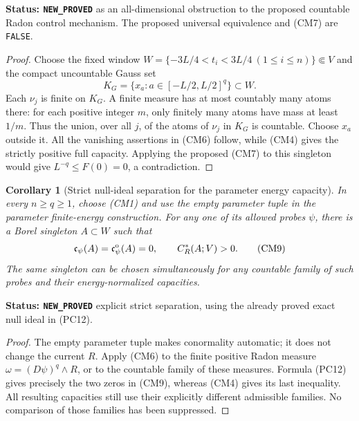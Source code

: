 \documentclass[11pt,a4paper]{article}
\numberwithin{equation}{section}
\newtheorem{corollary}[theorem]{Corollary}
\theoremstyle{definition}
\theoremstyle{remark}
\begin{document}
\noindent\textbf{Status: \texttt{NEW\_PROVED}} as an
all-dimensional obstruction to the proposed countable Radon
control mechanism. The proposed universal equivalence and (CM7)
are \texttt{FALSE}.

\begin{proof}
Choose the fixed window
$W=\{-3L/4<t_i<3L/4\ (1\leq i\leq n)\}\Subset V$
and the compact uncountable Gauss set
\[
                    K_G=\{x_a:a\in[-L/2,L/2]^q\}\subset W.
 \tag{CM8}
\]
Each $\nu_j$ is finite on $K_G$. A finite measure has at most
countably many atoms there: for each positive integer $m$, only
finitely many atoms have mass at least $1/m$. Thus the union,
over all $j$, of the atoms of $\nu_j$ in $K_G$ is countable.
Choose $x_a$ outside it. All the vanishing assertions in (CM6)
follow, while (CM4) gives the strictly positive full capacity.
Applying the proposed (CM7) to this singleton would give
$L^{-q}\leq F(0)=0$, a contradiction.
\end{proof}

\begin{corollary}[Strict null-ideal separation for the parameter energy capacity]
\label{cor:r12-parameter-capacity-strict-null-ideal}
In every $n\geq q\geq1$, choose (CM1) and use the empty parameter
tuple in the parameter finite-energy construction. For any one of
its allowed probes $\psi$, there is a Borel singleton $A\subset W$
such that
\[
                  \mathfrak c_\psi(A)
                    =\mathfrak c_\psi^{\rm o}(A)=0,
                         \qquad C_R^*(A;V)>0.
 \tag{CM9}
\]
The same singleton can be chosen simultaneously for any countable
family of such probes and their energy-normalized capacities.
\end{corollary}

\noindent\textbf{Status: \texttt{NEW\_PROVED}} explicit
strict separation, using the already proved exact null ideal
in (PC12).

\begin{proof}
The empty parameter tuple makes conormality automatic; it does
not change the current $R$. Apply (CM6) to the finite positive
Radon measure $\omega=(D\psi)^q\wedge R$, or to the countable
family of these measures. Formula (PC12) gives precisely the
two zeros in (CM9), whereas (CM4) gives its last inequality.
All resulting capacities still use their explicitly different
admissible families. No comparison of those families has been
suppressed.
\end{proof}
\end{document}
